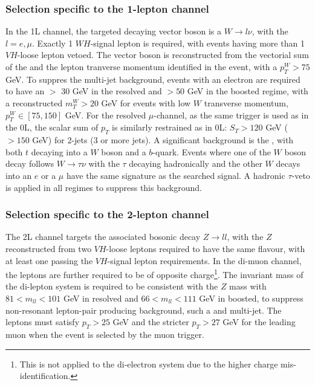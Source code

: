 \subsubsection{Selection specific to the 1-lepton channel}
In the 1L channel, the targeted decaying vector boson is a $W \rightarrow l\nu$, with the $l = e, \mu$. Exactly 1 $WH$-signal lepton is required, with events having more than 1 $VH$-loose lepton vetoed. The vector boson is reconstructed from the vectorial sum of the \etm and the lepton tranverse momentum identified in the event, with a $p_T^W > 75$ GeV. To suppres the multi-jet background, events with an electron are required to have an \etm $>$ 30 GeV in the resolved and $> 50$ GeV in the boosted regime, with a reconstructed $m_T^W > 20$ GeV for events with low $W$ transverse momentum, $p_T^W \in [75, 150]$ GeV. For the resolved $\mu$-channel, as the same \etm trigger is used as in the 0L, the scalar sum of $p_T$ is similarly restrained as in 0L: $S_T > 120$ GeV ($> 150$ GeV) for 2-jets (3 or more jets). A significant background is the \ttb, with both $t$ decaying into a $W$ boson and a $b$-quark. Events where one of the $W$ boson decay follows $W \rightarrow \tau \nu$ with the $\tau$ decaying hadronically and the other $W$ decays into an $e$ or a $\mu$ have the same signature as the searched signal. A hadronic $\tau$-veto is applied in all regimes to suppress this background.


\subsubsection{Selection specific to the 2-lepton channel}
The 2L channel targets the associated bosonic decay $Z \rightarrow ll$, with the $Z$ reconstructed from two $VH$-loose leptons required to have the same flavour, with at least one passing the $VH$-signal lepton requirements. In the di-muon channel, the leptons are further required to be of opposite charge\footnote{This is not applied to the di-electron system due to the higher charge mis-identification.}. The invariant mass of the di-lepton system is required to be consistent with the $Z$ mass with $81 < m_{ll} < 101$ GeV in resolved and $66 < m_{ll} < 111$ GeV in boosted, to suppress non-resonant lepton-pair producing background, such a \ttb and multi-jet. The leptons must satisfy $p_T > 25$ GeV and the stricter $p_T > 27$ GeV for the leading muon when the event is selected by the muon trigger.

